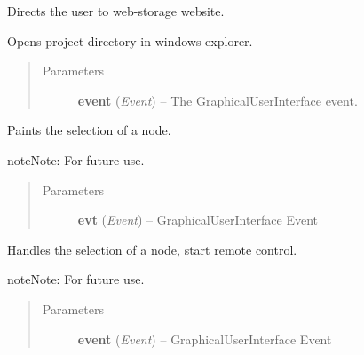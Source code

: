 \documentclass[letterpaper,10pt,english]{sphinxmanual}
\begin{document}
\begin{fulllineitems}
\begin{fulllineitems}
Directs the user to web-storage website.

\end{fulllineitems}


\begin{fulllineitems}
\label{diwacs:diwacs.GraphicalUserInterface.OpenProjectDir}
Opens project directory in windows explorer.
\begin{quote}\begin{description}
\item[{Parameters}] \leavevmode
\textbf{event} (\emph{Event}) -- The GraphicalUserInterface event.

\end{description}\end{quote}

\end{fulllineitems}


\begin{fulllineitems}
\label{diwacs:diwacs.GraphicalUserInterface.PaintSelect}
Paints the selection of a node.

\begin{notice}{note}{Note:}
For future use.
\end{notice}
\begin{quote}\begin{description}
\item[{Parameters}] \leavevmode
\textbf{evt} (\emph{Event}) -- GraphicalUserInterface Event

\end{description}\end{quote}

\end{fulllineitems}


\begin{fulllineitems}
\label{diwacs:diwacs.GraphicalUserInterface.SelectNode}
Handles the selection of a node, start remote control.

\begin{notice}{note}{Note:}
For future use.
\end{notice}
\begin{quote}\begin{description}
\item[{Parameters}] \leavevmode
\textbf{event} (\emph{Event}) -- GraphicalUserInterface Event


\end{description}
\end{quote}
\end{fulllineitems}
\end{fulllineitems}
\end{document}
